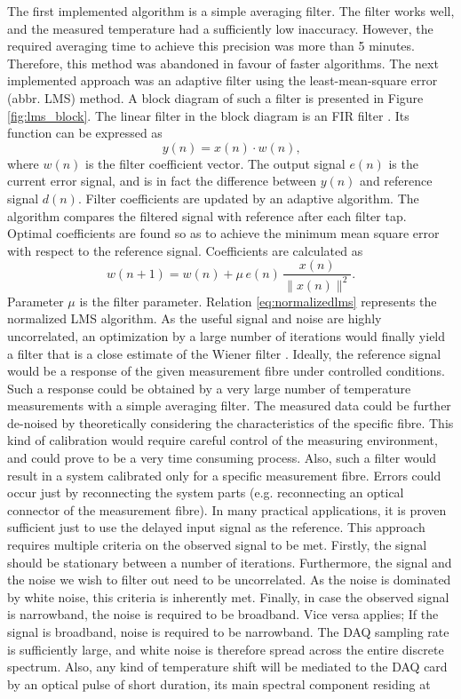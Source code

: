 \documentclass{standalone}
\begin{document}
The first implemented algorithm is a simple averaging filter. The filter works well, and the measured temperature had a sufficiently low inaccuracy. However, the required averaging time to achieve this precision was more than 5 minutes. Therefore, this method was abandoned in favour of faster algorithms. The next implemented approach was an adaptive filter using the least-mean-square error (abbr. LMS) method. A block diagram of such a filter is presented in Figure \ref{fig:lms_block}.
The linear filter in the block diagram is an FIR filter \cite{labview:aft}. Its function can be expressed as \cite{anc}\cite{mitlecture25}\cite{fer:dos}\cite{adaptivno0069}
\begin{equation}
y(n) = x(n) \cdot w(n) \textrm{,}
\end{equation}
where $w(n)$ is the filter coefficient vector. The output signal $e(n)$ is the current error signal, and is in fact the difference between $y(n)$ and reference signal $d(n)$. Filter coefficients are updated by an adaptive algorithm. The algorithm compares the filtered signal with reference after each filter tap. Optimal coefficients are found so as to achieve the minimum mean square error with respect to the reference signal. Coefficients are calculated as \cite{fer:spus}
\begin{equation} \label{eq:normalizedlms}
w(n+1) = w(n) + \mu \, e(n) \, \frac{x(n)}{\| x(n) \| ^2} \textrm{.}
\end{equation}
Parameter $\mu$ is the filter parameter. Relation \ref{eq:normalizedlms} represents the normalized LMS algorithm. As the useful signal and noise are highly uncorrelated, an optimization by a large number of iterations would finally yield a filter that is a close estimate of the Wiener filter \cite{haykin2003least}. Ideally, the reference signal would be a response of the given measurement fibre under controlled conditions. Such a response could be obtained by a very large number of temperature measurements with a simple averaging filter. The measured data could be further de-noised by theoretically considering the characteristics of the specific fibre. This kind of calibration would require careful control of the measuring environment, and could prove to be a very time consuming process. Also, such a filter would result in a system calibrated only for a specific measurement fibre. Errors could occur just by reconnecting the system parts (e.g. reconnecting an optical connector of the measurement fibre). In many practical applications, it is proven sufficient just to use the delayed input signal as the reference. This approach requires multiple criteria on the observed signal to be met. Firstly, the signal should be stationary between a number of iterations. Furthermore, the signal and the noise we wish to filter out need to be uncorrelated. As the noise is dominated by white noise, this criteria is inherently met. Finally, in case the observed signal is narrowband, the noise is required to be broadband. Vice versa applies; If the signal is broadband, noise is required to be narrowband. The DAQ sampling rate is sufficiently large, and white noise is therefore spread across the entire discrete spectrum. Also, any kind of temperature shift will be mediated to the DAQ card by an optical pulse of short duration, its main spectral component residing at
\end{document}
